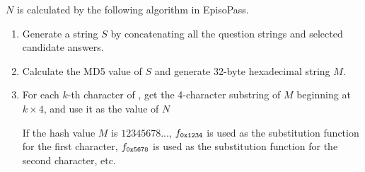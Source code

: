 \documentclass{sigchi}
\begin{document}

$N$ is calculated by the following algorithm in EpisoPass.
 
\begin{enumerate}
  \item Generate a string $S$ by concatenating all the question strings and selected candidate answers.

  \item Calculate the MD5 value of $S$ and generate 32-byte hexadecimal string $M$.

  \item For each $k$-th character of {\SS},
    get the 4-character substring of $M$ beginning at $k \times 4$, and use it as the value of $N$

    If the hash value $M$ is $12345678...$,
    $f_{\texttt{\scriptsize 0x1234}}$ is used as the substitution function for the first character,
    $f_{\texttt{\scriptsize 0x5678}}$ is used as the substitution function for the second character, etc.
\end{enumerate}
\end{document}

